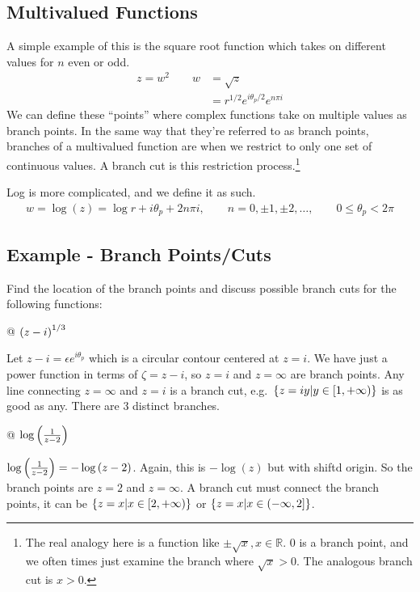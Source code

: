     \subsection{Multivalued Functions}
    A simple example of this is the square root function which takes on
    different values for $n$ even or odd.
    \begin{align*}
        z = w^2 \qquad w &= \sqrt{z}\\
        &= r^{1/2}e^{i\theta_p / 2}e^{n \pi i}
    \end{align*}
    We can define these ``points'' where complex functions take on multiple
    values as branch points. In the same way that they're referred to as
    branch points, branches of a multivalued function are when we restrict
    to only one set of continuous values. A branch cut is this restriction
    process.\footnote{The real analogy here is a function like $\pm\sqrt{x},
        x\in\mathbb{R}$.  $0$ is a branch point, and we often times just
        examine the branch where $\sqrt{x} > 0$. The analogous branch cut is
    $x > 0$.}

    Log is more complicated, and we define it as such.
    \begin{align*}
        w = \log(z) = \log r + i \theta_p + 2n\pi i,
        \qquad n = 0, \pm 1, \pm 2, \ldots,
        \qquad 0 \le \theta_p < 2\pi
    \end{align*}

    \subsection{Example - Branch Points/Cuts}
    Find the location of the branch points and discuss possible branch cuts
    for the following functions:
    \begin{easylist}[enumerate]
        @ ${\left( z - i \right)}^{1/3}$

        Let $z - i = \epsilon e^{i \theta_p}$ which is a circular contour
        centered at $z = i$. We have just a power function in terms of
        $\zeta=z-i$, so $z=i$ and $z=\infty$ are branch points. Any line
        connecting $z = \infty$ and $z=i$ is a branch cut, e.g.\
        ${\left\{ z=iy|y\in[1,+\infty) \right\}}$ is as good as any. There are 3
        distinct branches.

        @ $\log{\left( \frac{1}{z-2} \right)}$

        $\log{\left( \frac{1}{z-2} \right)} = -\log{\left( z-2 \right)}$. Again, this is
        $-\log(z)$ but with shiftd origin. So the branch points are $z=2$
        and $z=\infty$. A branch cut must connect the branch points, it can
        be ${\left\{ z=x|x\in[2,+\infty) \right\}}$ or ${\left\{ z=x|x\in(-\infty,2] \right\}}$.
    \end{easylist}

